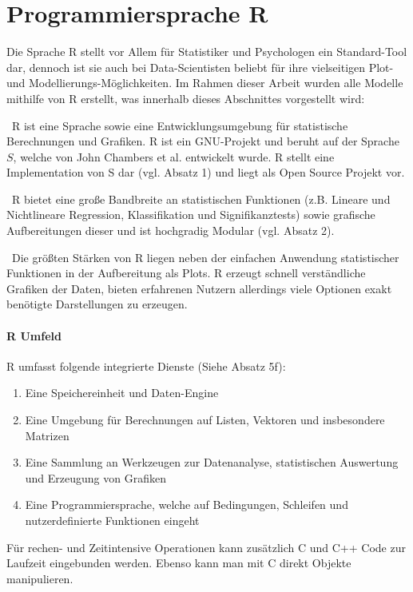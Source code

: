 \section{Programmiersprache R}
\label{sec:R}
Die Sprache R stellt vor Allem für Statistiker und Psychologen ein Standard-Tool dar, dennoch ist sie auch bei Data-Scientisten beliebt für ihre vielseitigen Plot- und Modellierungs-Möglichkeiten. Im Rahmen dieser Arbeit wurden alle Modelle mithilfe von R erstellt, was innerhalb dieses Abschnittes vorgestellt wird:

~\newline R ist eine Sprache sowie eine Entwicklungsumgebung für statistische Berechnungen und Grafiken. R ist ein GNU-Projekt und beruht auf der Sprache $S$, welche von John Chambers et al. entwickelt wurde. R stellt eine Implementation von S dar (vgl. \cite{RProject} Absatz 1) und liegt als Open Source Projekt vor.

~\newline R bietet eine große Bandbreite an statistischen Funktionen (z.B. Lineare und Nichtlineare Regression, Klassifikation und Signifikanztests) sowie grafische Aufbereitungen dieser und ist hochgradig Modular (vgl. \cite{RProject} Absatz 2). 

~\newline Die größten Stärken von R liegen neben der einfachen Anwendung statistischer Funktionen in der Aufbereitung als Plots. R erzeugt schnell verständliche Grafiken der Daten, bieten erfahrenen Nutzern allerdings viele Optionen exakt benötigte Darstellungen zu erzeugen. 

\paragraph{ R Umfeld} 
R umfasst folgende integrierte Dienste (Siehe \cite{RProject} Absatz 5f):
\begin{enumerate}
	\item Eine Speichereinheit und Daten-Engine
	\item Eine Umgebung für Berechnungen auf Listen, Vektoren und insbesondere Matrizen
	\item Eine Sammlung an Werkzeugen zur Datenanalyse, statistischen Auswertung und Erzeugung von Grafiken
	\item Eine Programmiersprache, welche auf Bedingungen, Schleifen und nutzerdefinierte Funktionen eingeht
\end{enumerate}

Für rechen- und Zeitintensive Operationen kann zusätzlich C und C++ Code zur Laufzeit eingebunden werden. Ebenso kann man mit C direkt Objekte manipulieren. 

